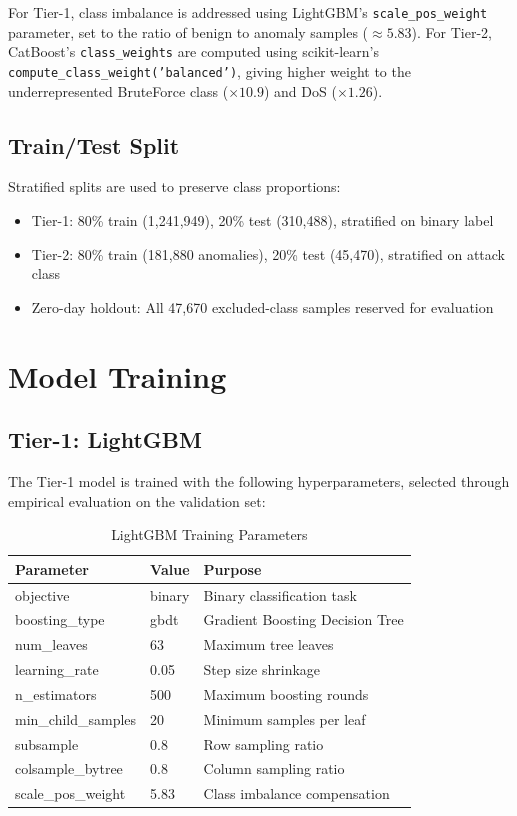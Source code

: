 \documentclass[12pt,a4paper,twoside]{report}
\begin{document}
For Tier-1, class imbalance is addressed using LightGBM's \texttt{scale\_pos\_weight} parameter, set to the ratio of benign to anomaly samples ($\approx 5.83$). For Tier-2, CatBoost's \texttt{class\_weights} are computed using scikit-learn's \texttt{compute\_class\_weight('balanced')}, giving higher weight to the underrepresented BruteForce class ($\times 10.9$) and DoS ($\times 1.26$).

\subsection{Train/Test Split}

Stratified splits are used to preserve class proportions:
\begin{itemize}
    \item Tier-1: 80\% train (1,241,949), 20\% test (310,488), stratified on binary label
    \item Tier-2: 80\% train (181,880 anomalies), 20\% test (45,470), stratified on attack class
    \item Zero-day holdout: All 47,670 excluded-class samples reserved for evaluation
\end{itemize}

\section{Model Training}

\subsection{Tier-1: LightGBM}

The Tier-1 model is trained with the following hyperparameters, selected through empirical evaluation on the validation set:

\begin{table}[H]
\centering
\caption{LightGBM Training Parameters}
\begin{tabularx}{\textwidth}{llX}
\toprule
\textbf{Parameter} & \textbf{Value} & \textbf{Purpose} \\
\midrule
objective & binary & Binary classification task \\
boosting\_type & gbdt & Gradient Boosting Decision Tree \\
num\_leaves & 63 & Maximum tree leaves \\
learning\_rate & 0.05 & Step size shrinkage \\
n\_estimators & 500 & Maximum boosting rounds \\
min\_child\_samples & 20 & Minimum samples per leaf \\
subsample & 0.8 & Row sampling ratio \\
colsample\_bytree & 0.8 & Column sampling ratio \\
scale\_pos\_weight & 5.83 & Class imbalance compensation \\
\bottomrule
\end{tabularx}
\end{table}
\end{document}
